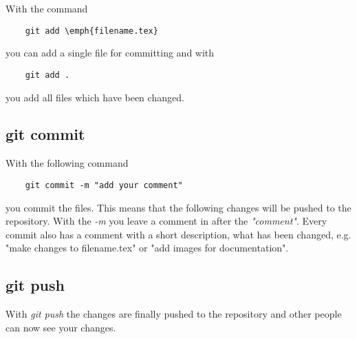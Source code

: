 \documentclass[
	a4paper, %
	10pt, %
	unnumberedsections, %
	twoside, %
	onecolumn,
]{LTJournalArticle}
\begin{document}
With the command 
\begin{verbatim}
	git add \emph{filename.tex}
\end{verbatim}
you can add a single file for committing and with
\begin{verbatim}
	git add .
\end{verbatim}
you add all files which have been changed.

\subsection{git commit}
With the following command
\begin{verbatim}
	git commit -m "add your comment"
\end{verbatim}
you commit the files. This means that the following changes will be pushed to the repository. 
With the \emph{-m} you leave a comment in after the \emph{"comment"}. Every commit also has a comment with a short description, what has been changed, e.g. "make changes to filename.tex" or "add images for documentation".

\subsection{git push}
With \emph{git push}  the changes are finally pushed to the repository and other people can now see your changes.


\end{document}
